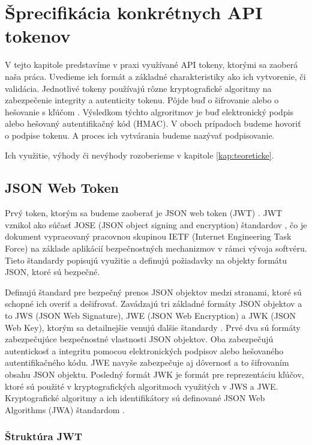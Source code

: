 \chapter{Šprecifikácia konkrétnych API tokenov}

\label{kap:typy} %

V tejto kapitole predstavíme v praxi využívané API tokeny, ktorými sa zaoberá naša práca. Uvedieme ich formát a základné charakteristiky ako ich vytvorenie, či validácia. Jednotlivé tokeny používajú rôzne kryptografické algoritmy na zabezpečenie integrity a autenticity tokenu. Pôjde buď o šifrovanie alebo o hešovanie s kľúčom \cite{hmac}. Výsledkom týchto algroritmov je buď elektronický podpis alebo hešovaný autentifikačný kód (HMAC). V oboch prípadoch budeme hovoriť o podpise tokenu. A proces ich vytvárania budeme nazývať podpisovanie.

Ich využitie, výhody či nevýhody rozoberieme v kapitole \ref{kap:teoreticke}.


\section{JSON Web Token}

Prvý token, ktorým sa budeme zaoberať je JSON web token (JWT) \cite{jwt_rfc}. JWT vznikol ako súčasť JOSE (JSON object signing and encryption) štandardov \cite{jose_rfc}, čo je dokument vypracovaný pracovnou skupinou IETF (Internet Engineering Task Force) na základe aplikácií bezpečnostných mechanizmov v rámci vývoja softvéru. Tieto štandardy popisujú využitie a definujú požiadavky na objekty formátu JSON, ktoré sú bezpečné.

Definujú štandard pre bezpečný prenos JSON objektov medzi stranami, ktoré sú schopné ich overiť a dešifrovať. Zavádzajú tri základné formáty JSON objektov a to JWS (JSON Web Signature), JWE (JSON Web Encryption) a JWK (JSON Web Key), ktorým sa detailnejšie venujú ďalšie štandardy \cite{jws_rfc, jwe_rfc, jwk_rfc}. Prvé dva sú formáty zabezpečujúce bezpečnostné vlastnosti JSON objektov. Oba zabezpečujú autentickosť a integritu pomocou elektronických podpisov alebo hešovaného autentifikačného kódu. JWE navyše zabezpečuje aj dôvernosť a to šifrovaním obsahu JSON objektu. Posledný formát JWK je formát pre reprezentáciu kľúčov, ktoré sú použité v kryptografických algoritmoch využitých v JWS a JWE. Kryptografické algoritmy a ich identifikátory sú definované JSON Web Algorithms (JWA) štandardom \cite{jwa_rfc}.


\subsection{Štruktúra JWT}

